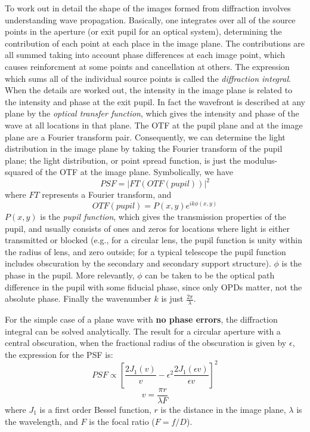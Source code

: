 \documentclass[12pt]{article}
\begin{document}
To work out in detail the shape of the images formed from diffraction
involves understanding wave propagation. Basically, one integrates
over all of the source points in the aperture (or exit pupil for an
optical system), determining the contribution of each point at each
place in the image plane. The contributions are all summed taking into
account phase differences at each image point, which causes
reinforcment at some points and cancellation at others. The expression
which sums all of the individual source points is called the
\textit{diffraction integral}. When the details are worked out,
the intensity in the image plane is related to the intensity and phase
at the exit pupil. In fact the wavefront is described at any plane by
the \textit{optical transfer function}, which gives the intensity and phase of
the wave at all locations in that plane. The OTF at the pupil plane
and at the image plane are a Fourier transform pair. Consequently, we
can determine the light distribution in the image plane by taking the
Fourier transform of the pupil plane; the light distribution, or point
spread function, is just the modulus-squared of the OTF at the image
plane. Symbolically, we have
\[
    PSF = \left\vert{FT(OTF(pupil))}\right\vert^{2}
    \]
where $FT$ represents a Fourier transform, and
\[
    OTF(pupil) = P(x,y)e^{ik\phi(x,y)}
    \]
$P(x,y)$ is the \textit{pupil function}, which gives the transmission
properties of the pupil, and usually consists of ones and zeros for
locations where light is either transmitted or blocked (e.g., for a
circular lens, the pupil function is unity within the radius of lens,
and zero outside; for a typical telescope the pupil function includes
obscuration by the secondary and secondary support structure).
$\phi$ is the phase in the pupil. More relevantly, $\phi$ can be
taken to be the optical path difference in the pupil with some
fiducial phase, since only OPDs matter, not the absolute phase.
Finally the wavenumber $k$ is just $\frac{2\pi}{\lambda}$.

For the simple case of a plane wave with \textbf{no phase errors}, the
diffraction integral can be solved analytically. The result for a
circular aperture with a central obscuration, when the fractional
radius of the obscuration is given by $\epsilon$, the expression for
the PSF is:
\[
    PSF \propto \left[
        \frac{2J_{1}(v)}{v} -
        \epsilon^{2}\frac{2J_{1}(\epsilon{v})}{\epsilon{v}}
        \right]^{2}
    \]
\[
    v = \frac{\pi{r}}{\lambda{F}}
    \]
where $J_{1}$ is a first order Bessel function, $r$ is the distance in the
image plane, $\lambda$ is the wavelength, and $F$ is the focal ratio
($F=f/D$).
\end{document}

